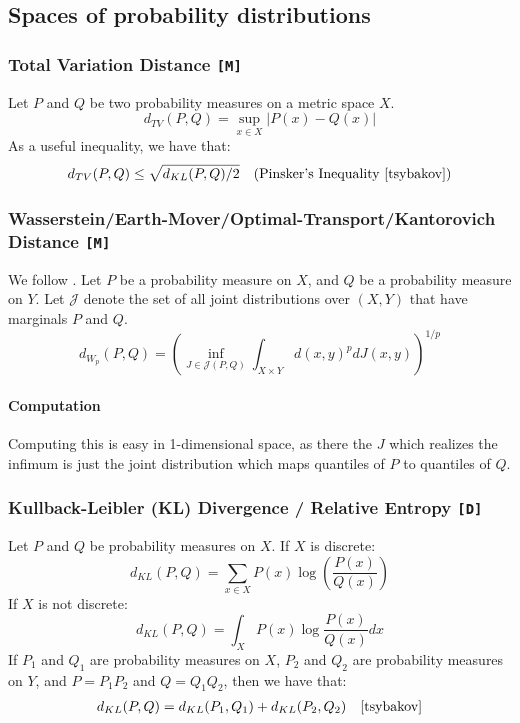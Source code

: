 \documentclass[12pt,a4paper]{article}
\newcommand{\1}[1]{\mathds{1}\left[#1\right]}
\newcommand{\C}[1]{\mathscr{#1}}
\begin{document}
\subsection{Spaces of probability distributions}
\subsubsection{Total Variation Distance \texttt{[M]}}
Let $P$ and $Q$ be two probability measures on a metric space $X$.
\[d_{TV}(P,Q)=\sup_{x\in X}|P(x)-Q(x)|\]
As a useful inequality, we have that:
\begin{align*}d_{TV}(P,Q)&\leq \sqrt{d_{KL}(P,Q)/2}& \text{(Pinsker's Inequality \cite{tsybakov})}\end{align*}


\subsubsection{Wasserstein/Earth-Mover/Optimal-Transport/Kantorovich Distance \texttt{[M]}}
We follow \cite{wassermanwasserstein}. Let $P$ be a probability measure on $X$, and $Q$ be a probability measure on $Y$. Let $\C J$ denote the set of all joint distributions over $(X,Y)$ that have marginals $P$ and $Q$.
\[d_{W_p}(P,Q)=\left(\inf_{J\in \C J(P,Q)}\int_{X\times Y} d(x,y)^pdJ(x,y)\right)^{1/p}\]
\paragraph{Computation} Computing this is easy in 1-dimensional space, as there the $J$ which realizes the infimum is just the joint distribution which maps quantiles of $P$ to quantiles of $Q$.

\subsubsection{Kullback-Leibler (KL) Divergence / Relative Entropy \texttt{[D]}}
Let $P$ and $Q$ be probability measures on $X$. If $X$ is discrete:
\[d_{KL}(P,Q) = \sum_{x\in X}P(x)\log\left(\frac{P(x)}{Q(x)}\right)\]
If $X$ is not discrete:
\[d_{KL}(P,Q) = \int_{X}P(x)\log\frac{P(x)}{Q(x)}dx\]
If $P_1$ and $Q_1$ are probability measures on $X$, $P_2$ and $Q_2$ are probability measures on $Y$, and $P=P_1P_2$ and $Q=Q_1Q_2$, then we have that:
\begin{align*}d_{KL}(P,Q)&=d_{KL}(P_1,Q_1)+d_{KL}(P_2,Q_2) & \text{\cite{tsybakov}}\end{align*}
\end{document}
